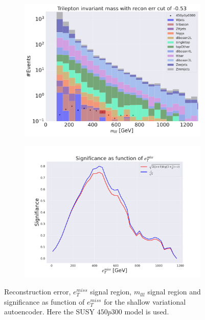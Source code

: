 \begin{figure}[H]
    \hfill
    \begin{subfigure}{.40\textwidth}
        \includegraphics[width=\textwidth]{Figures/VAE_testing/small/3lep/b_data_recon_big_rm3_feats_sig_450p0p0300_mlll_recon_errcut_-0.53.pdf}
        \caption{}
        \label{fig:VAE_3lep_small_mlll_450_3}
    \end{subfigure}
    \hfill   
    \begin{subfigure}{.40\textwidth}
        \includegraphics[width=\textwidth]{Figures/VAE_testing/small/3lep/significance_etmiss_450p0p0300_-0.530518613616577.pdf}
        \caption{}
        \label{fig:VAE_3lep_small_signi_450_3}
    \end{subfigure}
    \hfill      
    \caption[3lep shallow network | $450p300$ | VAE | 3]{Reconstruction error, $e_T^{miss}$ signal region, $m_{lll}$ signal region and significance as function of 
    $e_T^{miss}$ for the shallow variational autoencoder. Here the SUSY $450p300$ model is used.}
    \label{fig:VAE_3lep_small_rec_sig_signi_450_3}
\end{figure}









